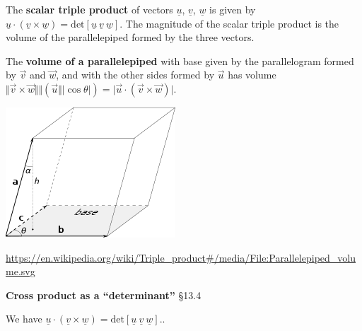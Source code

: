 \documentclass[12pt,letterpaper,noanswers]{exam}
\newcommand{\mb}[1]{\underline{#1}}
\begin{document}
\begin{tcolorbox}
The \textbf{scalar triple product} of vectors $\mb{u}$, $\mb{v}$, $\mb{w}$ is given by $\mb{u}\cdot(\mb{v}\times\mb{w})= \text{det}\left[\mb{u}\ \mb{v}\ \mb{w}\right]$.  The magnitude of the scalar triple product is the volume of the parallelepiped formed by the three vectors.

The \textbf{volume of a parallelepiped} with base given by the parallelogram formed by $\vec v$ and $\vec w$, and with the other sides formed by $\vec u$ has volume $\Vert \vec v \times \vec w\Vert\Vert (\vec u\Vert\vert\cos\theta\vert) =\vert \vec u\cdot(\vec v \times \vec w)\vert.$
\end{tcolorbox}

\includegraphics[]{img/C06scalartriple.png}

\url{https://en.wikipedia.org/wiki/Triple_product#/media/File:Parallelepiped_volume.svg}

\noindent\textbf{Cross product as a ``determinant''} \S 13.4

We have $\mb{u}\cdot(\mb{v}\times\mb{w}) = \text{det}[\mb{u}\ \mb{v}\ \mb{w}].$.
\end{document}
